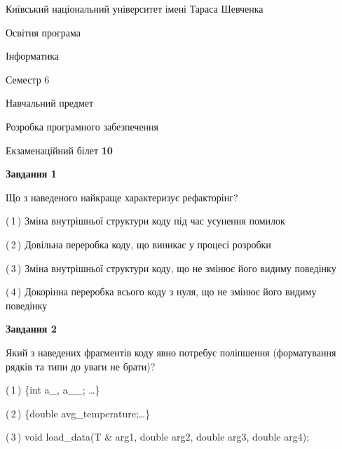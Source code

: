 \documentclass[10pt, ukrainian]{article}
\begin{document}
{{\begin {small}\par
{ \center  Київський національний університет імені Тараса Шевченка \par}
{\parbox {5 cm}{Освітня програма \hfill}{\parbox {7 cm}{Інформатика \hfill}}\parbox {6 cm}{\hfill Семестр 6}}\par
{\parbox {5 cm} {Навчальний предмет \hfill}\parbox {7 cm}{Розробка програмного забезпечення \hfill}\parbox {6cm}{\hfill}\par}\vspace{-7pt} \end{small}}{\center Екзаменаційний білет \No \textbf
{ 10 }\par}}
{
\begin {large}
{\begin {center}\textbf{Завдання 1}\end {center}}\par
Що з наведеного найкраще характеризує рефакторінг?\par
\vspace{2mm}



(\,1\,) Зміна внутрішньої структури коду під час усунення помилок%



(\,2\,) Довільна переробка коду, що виникає у процесі розробки%



(\,3\,) Зміна внутрішньої структури коду, що не змінює його видиму поведінку%



(\,4\,) Докорінна переробка всього коду з нуля,  що не змінює його видиму поведінку%


{\begin {center}\textbf{Завдання 2}\end {center}}\par
Який з наведених фрагментів коду явно потребує поліпшення (форматування рядків та типи до уваги не брати)?\par
\vspace{2mm}



(\,1\,) \{int a\_, a\_\_; …\}%



(\,2\,) \{double avg\_temperature;…\} %



(\,3\,) void load\_data(T \& arg1, double arg2, double arg3, double arg4); %




\end{large}}
\end{document}

